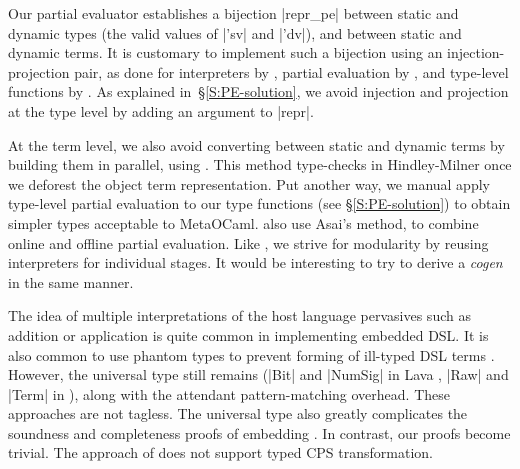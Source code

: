 Our partial evaluator establishes a bijection |repr_pe| between static
and dynamic types (the valid values of |'sv| and |'dv|), and between
static and dynamic terms.  It is customary to implement such a bijection
using an injection\hyp projection pair, as done for interpreters by
\cite{Ramsey-ML-module-mania,Benton-embedded-interpreters},
partial evaluation by \cite{Danvy-TDPE}, and type-level functions by
\cite{oliveira-typecase}.  As explained in~\S\ref{S:PE-solution}, we
avoid injection and projection at the type level by adding an argument
to |repr|.

At the term level, we also avoid converting between static and dynamic
terms by building them in parallel, using \citet{asai-binding-time}.
This method type-checks in Hindley-Milner once we
deforest the object term representation.  Put another way, we
manual apply type-level partial evaluation to our type
functions (see \S\ref{S:PE-solution}) to obtain simpler types 
acceptable to MetaOCaml.
 also use Asai's method,
to combine online
and offline partial evaluation.  Like \cite{SperberThiemann:TwoForOne},
we strive for modularity by reusing interpreters for individual stages.  It would be interesting
to try to derive a \emph{cogen} \cite{Thiemann:cogeninsixlines}
in the same manner.

The idea of multiple interpretations of the host language pervasives
such as addition or application is quite common in implementing
embedded DSL. It is also common to use phantom types to prevent
forming of ill-typed DSL terms \cite{Lava,Rhiger-thesis}. However,
the universal type still remains (|Bit| and |NumSig| in Lava
\cite{Lava}, |Raw| and |Term| in \cite[Fig 2.2,
  Sec. 3]{Rhiger-thesis}), along with the attendant pattern-matching
overhead. These approaches are not tagless.  The universal type also
greatly complicates the soundness and completeness proofs of embedding
\cite{Rhiger-thesis}. In contrast, our proofs become trivial.
The approach of  does not 
support typed CPS transformation.
\begin{comment}
Rhiger's But Fig 2.2, p33: universal type Raw.  He uses phantom type
upon the Exp datatype. But that is cheating: phantom type means
essentially we can easily do coerce. We use real types.  That's why he
had to do tedious proofs in Sec 2 of soundness and completeness of
embedding. Whereas our proofs are obvious.  His sec 3 is based on data
representation of terms. They have type tags.  We do nothing of that
kind: See Sec 3.1.2. See numerous "data Term" in Sec3, which is the U
type.  In Sec 3.3.4 (p76) Rhiger specifically says that his encoding
cannot do typed CPS transformation -- whereas our does. BTW, Rhiger
thesis contains the definitions of the interpreter and the compiler,
in the beginning. Use this in response to Rev1)
\end{comment}


